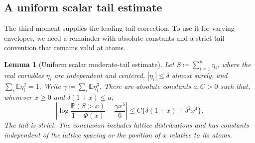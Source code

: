 \documentclass[11pt,letterpaper]{article}
\newtheorem{lemma}{Lemma}
\theoremstyle{remark}
\newcommand{\E}{\mathbb E}
\newcommand{\Pp}{\mathbb P}
\begin{document}
\subsection{A uniform scalar tail estimate}
\label{app:moderate-tail-proof}
The third moment supplies the leading tail correction. To use it for
varying envelopes, we need a remainder with absolute constants and a
strict-tail convention that remains valid at atoms.

\begin{lemma}[Uniform scalar moderate-tail estimate]
\label{opt:moderate-tail}
Let \(S\coloneqq\sum_{i=1}^n\eta_i\), where the real variables \(\eta_i\) are
independent and centered, \(|\eta_i|\le\delta\) almost surely, and
\(\sum_i\E\eta_i^2=1\). Write
\(\gamma\coloneqq\sum_i\E\eta_i^3\). There are absolute constants \(a,C>0\)
such that, whenever \(x\ge0\) and \(\delta(1+x)\le a\),
\begin{equation}
 \left|\log\frac{\Pp(S>x)}{1-\Phi(x)}
       -\frac{\gamma x^3}{6}\right|
 \le C\{\delta(1+x)+\delta^2x^4\}.
 \label{opt:moderate-tail-formula}
\end{equation}
The tail is strict. The conclusion includes lattice distributions and
has constants independent of the lattice spacing or the position of
\(x\) relative to its atoms.
\end{lemma}
\end{document}
